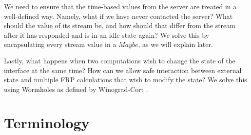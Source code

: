 \documentclass[twocolumn,11pt,english]{article}
\begin{document}
We need to ensure that the time-based values from the server are treated in a well-defined way. Namely, what if we have never contacted the server? What should the value of its stream be, and how should that differ from the stream after it has responded and is in an idle state again? We solve this by encapsulating every stream value in a $Maybe$, as we will explain later. 

Lastly, what happens when two computations wish to change the state of the interface at the same time? How can we allow safe interaction between external state and multiple FRP calculations that wish to modify the state? We solve this using Wormholes as defined by Winograd-Cort \cite{WinogradCort2012HS}.

\section{Terminology}
\end{document}
